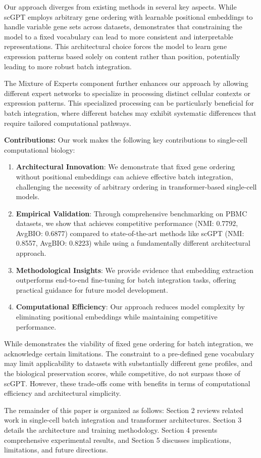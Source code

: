 Our approach diverges from existing methods in several key aspects. While scGPT employs arbitrary gene ordering with learnable positional embeddings to handle variable gene sets across datasets, \bioformer{} demonstrates that constraining the model to a fixed vocabulary can lead to more consistent and interpretable representations. This architectural choice forces the model to learn gene expression patterns based solely on content rather than position, potentially leading to more robust batch integration.

The Mixture of Experts component further enhances our approach by allowing different expert networks to specialize in processing distinct cellular contexts or expression patterns. This specialized processing can be particularly beneficial for batch integration, where different batches may exhibit systematic differences that require tailored computational pathways.

\textbf{Contributions:} Our work makes the following key contributions to single-cell computational biology:

\begin{enumerate}
\item \textbf{Architectural Innovation}: We demonstrate that fixed gene ordering without positional embeddings can achieve effective batch integration, challenging the necessity of arbitrary ordering in transformer-based single-cell models.

\item \textbf{Empirical Validation}: Through comprehensive benchmarking on PBMC datasets, we show that \bioformer{} achieves competitive performance (NMI: 0.7792, AvgBIO: 0.6877) compared to state-of-the-art methods like scGPT (NMI: 0.8557, AvgBIO: 0.8223) while using a fundamentally different architectural approach.

\item \textbf{Methodological Insights}: We provide evidence that embedding extraction outperforms end-to-end fine-tuning for batch integration tasks, offering practical guidance for future model development.

\item \textbf{Computational Efficiency}: Our approach reduces model complexity by eliminating positional embeddings while maintaining competitive performance.
\end{enumerate}

While \bioformer{} demonstrates the viability of fixed gene ordering for batch integration, we acknowledge certain limitations. The constraint to a pre-defined gene vocabulary may limit applicability to datasets with substantially different gene profiles, and the biological preservation scores, while competitive, do not surpass those of scGPT. However, these trade-offs come with benefits in terms of computational efficiency and architectural simplicity.

The remainder of this paper is organized as follows: Section 2 reviews related work in single-cell batch integration and transformer architectures. Section 3 details the \bioformer{} architecture and training methodology. Section 4 presents comprehensive experimental results, and Section 5 discusses implications, limitations, and future directions.